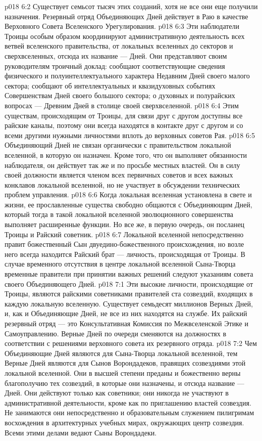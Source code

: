 \vs p018 6:2 Существует семьсот тысяч этих созданий, хотя не все они еще получили назначения. Резервный отряд Объединяющих Дней действует в Раю в качестве Верховного Совета Вселенского Урегулирования.
\vs p018 6:3 Эти наблюдатели Троицы особым образом координируют административную деятельность всех ветвей вселенского правительства, от локальных вселенных до секторов и сверхвселенных, отсюда их название ---  Дней. Они представляют своим руководителям троичный доклад: сообщают соответствующие сведения физического и полуинтеллектуального характера Недавним Дней своего малого сектора; сообщают об интеллектуальных и квазидуховных событиях Совершенствам Дней своего большого сектора; о духовных и полурайских вопросах --- Древним Дней в столице своей сверхвселенной.
\vs p018 6:4 Этим существам, происходящим от Троицы, для связи друг с другом доступны все райские каналы, поэтому они всегда находятся в контакте друг с другом и со всеми другими нужными личностями вплоть до верховных советов Рая.
\vs p018 6:5 \pc Объединяющий Дней не связан органически с правительством локальной вселенной, в которую он назначен. Кроме того, что он выполняет обязанности наблюдателя, он действует так же и по просьбе местных властей. Он в силу своей должности является членом всех первичных советов и всех важных конклавов локальной вселенной, но не участвует в обсуждении технических проблем управления.
\vs p018 6:6 Когда локальная вселенная установлена в свете и жизни, ее прославленные существа свободно общаются с Объединяющим Дней, который тогда в такой локальной вселенной эволюционного совершенства выполняет расширенные функции. Но все же, в первую очередь, он посланец Троицы и Райский советник.
\vs p018 6:7 Локальной вселенной непосредственно правит божественный Сын двуедино\hyp{}божественного происхождения, но возле него всегда находится Райский брат --- личность, происходящая от Троицы. В случае временного отсутствия в центре локальной вселенной Сына\hyp{}Творца временные правители при принятии важных решений следуют указаниям совета своего Объединяющего Дней.
\vs p018 7:1 Эти высокие личности, происходящие от Троицы, являются райскими советниками правителей ста созвездий, входящих в каждую локальную вселенную. Существует семьдесят миллионов Верных Дней, и, как и Объединяющие Дней, не все из них находятся на службе. Их райский резервный отряд --- это Консультативная Комиссия по Межвселенской Этике и Самоуправлению. Верные Дней по очереди сменяются на должностях в соответствии с решениями верховного совета их резервного отряда.
\vs p018 7:2 Чем Объединяющие Дней являются для Сына\hyp{}Творца локальной вселенной, тем Верные Дней являются для Сынов Ворондадеков, правящих созвездиями этой локальной вселенной. Они в высшей степени преданы и божественно верны благополучию тех созвездий, в которые они назначены, и отсюда название ---  Дней. Они действуют только как советники; они никогда не участвуют в административной деятельности, кроме как по приглашению властей созвездия. Не занимаются они непосредственно и образовательным служением пилигримам восхождения в архитектурных учебных мирах, окружающих центр созвездия. Всеми этими делами ведают Сыны Ворондадеки.
